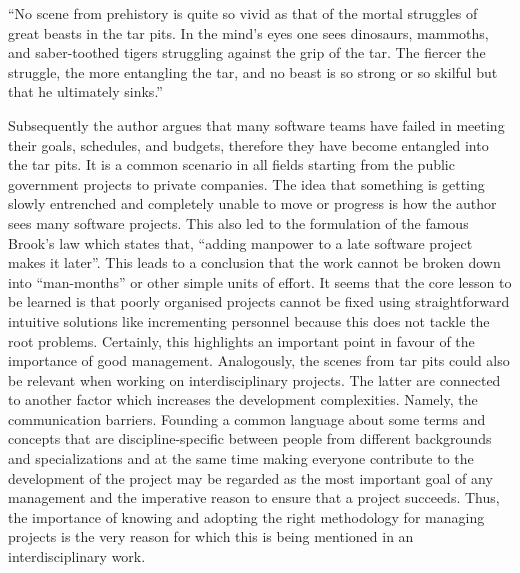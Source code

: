 \begin{displayquote}
    “No scene from prehistory is quite so vivid as that of the mortal struggles of great beasts in the tar pits. In the mind’s eyes one sees dinosaurs, mammoths, and saber-toothed tigers struggling against the grip of the tar. The fiercer the struggle, the more entangling the tar, and no beast is so strong or so skilful but that he ultimately sinks.”
\end{displayquote}

Subsequently the author argues that many software teams have failed in meeting their goals, schedules, and budgets, therefore they have become entangled into the tar pits. It is a common scenario in all fields starting from the public government projects to private companies. The idea that something is getting slowly entrenched and completely unable to move or progress is how the author sees many software projects.
This also led to the formulation of the famous Brook’s law which states that, “adding manpower to a late software project makes it later”. This leads to a conclusion that the work cannot be broken down into “man-months” or other simple units of effort. It seems that the core lesson to be learned is that poorly organised projects cannot be fixed using straightforward intuitive solutions like incrementing personnel because this does not tackle the root problems. Certainly, this highlights an important point in favour of the importance of good management.
Analogously, the scenes from tar pits could also be relevant when working on interdisciplinary projects. The latter are connected to another factor which increases the development complexities. Namely, the communication barriers. Founding a common language about some terms and concepts that are discipline-specific between people from different backgrounds and specializations and at the same time making everyone contribute to the development of the project may be regarded as the most important goal of any management and the imperative reason to ensure that a project succeeds. Thus, the importance of knowing and adopting the right methodology for managing projects is the very reason for which this is being mentioned in an interdisciplinary work.


